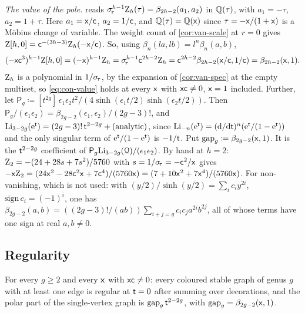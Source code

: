 \emph{The value of the pole.}  reads $\sigma_{\!\tau}^{h-1}\mathrm{Z}_h(\tau)=\beta_{2h-2}(a_1,a_2)$ in $\mathbb{Q}(\tau)$, with $a_1=-\tau$, $a_2=1+\tau$. Here $a_1=\mathsf{x}/\mathsf{c}$, $a_2=1/\mathsf{c}$, and $\mathbb{Q}(\tau)=\mathbb{Q}(\mathsf{x})$ since $\tau=-\mathsf{x}/(1+\mathsf{x})$ is a M\"obius change of variable. The weight count of \cref{cor:van-scale} at $r=0$ gives $\mathrm{Z}[h,0]=\mathsf{c}^{-(3h-3)}\mathrm{Z}_h(-\mathsf{x}/\mathsf{c})$. So, using $\beta_n(la,lb)=l^n\beta_n(a,b)$,
\begin{equation}
\label{eq:con-value}
(-\mathsf{x}\mathsf{c}^3)^{h-1}\mathrm{Z}[h,0]=(-\mathsf{x})^{h-1}\mathrm{Z}_h=\sigma_{\!\tau}^{h-1}\mathsf{c}^{2h-2}\mathrm{Z}_h=\mathsf{c}^{2h-2}\beta_{2h-2}(\mathsf{x}/\mathsf{c},1/\mathsf{c})=\beta_{2h-2}(\mathsf{x},1).
\end{equation}
$\mathrm{Z}_h$ is a polynomial in $1/\sigma_{\!\tau}$, by the expansion of \cref{cor:van-spec} at the empty multiset, so \cref{eq:con-value} holds at every $\mathsf{x}$ with $\mathsf{x}\mathsf{c}\neq 0$, $\mathsf{x}=1$ included. Further, let $\mathsf{P}_g\coloneqq[t^{2g}]\,\epsilon_1\epsilon_2t^2/(4\sinh(\epsilon_1t/2)\sinh(\epsilon_2t/2))$. Then $\mathsf{P}_g/(\epsilon_1\epsilon_2)=\beta_{2g-2}(\epsilon_1,\epsilon_2)/(2g-3)!$, and $\mathrm{Li}_{3-2g}(\mathrm{e}^{\mathsf{t}})=(2g-3)!\,\mathsf{t}^{2-2g}+(\text{analytic})$, since $\mathrm{Li}_{-n}(\mathrm{e}^{\mathsf{t}})=(\mathrm{d}/\mathrm{d}\mathsf{t})^n(\mathrm{e}^{\mathsf{t}}/(1-\mathrm{e}^{\mathsf{t}}))$ and the only singular term of $\mathrm{e}^{\mathsf{t}}/(1-\mathrm{e}^{\mathsf{t}})$ is $-1/\mathsf{t}$. Put $\mathrm{gap}_g\coloneqq\beta_{2g-2}(\mathsf{x},1)$. It is the $\mathsf{t}^{2-2g}$ coefficient of $\mathsf{P}_g\mathrm{Li}_{3-2g}(\mathcal{Q})/(\epsilon_1\epsilon_2)$. By hand at $h=2$: $\mathrm{Z}_2=-(24+28s+7s^2)/5760$ with $s=1/\sigma_{\!\tau}=-\mathsf{c}^2/\mathsf{x}$ gives $-\mathsf{x}\mathrm{Z}_2=(24\mathsf{x}^2-28\mathsf{c}^2\mathsf{x}+7\mathsf{c}^4)/(5760\mathsf{x})=(7+10\mathsf{x}^2+7\mathsf{x}^4)/(5760\mathsf{x})$. For non-vanishing, which is not used: with $(y/2)/\sinh(y/2)=\sum_ic_iy^{2i}$, $\mathrm{sign}\,c_i=(-1)^i$, one has $\beta_{2g-2}(a,b)=((2g-3)!/(ab))\sum_{i+j=g}c_ic_ja^{2i}b^{2j}$, all of whose terms have one sign at real $a,b\neq 0$.

\subsection{Regularity}

\begin{cor}
\label{cor:con-reg}
For every $g\geq 2$ and every $\mathsf{x}$ with $\mathsf{x}\mathsf{c}\neq 0$: every coloured stable graph of genus $g$ with at least one edge is regular at $\mathsf{t}=0$ after summing over decorations, and the polar part of the single-vertex graph is $\mathrm{gap}_g\,\mathsf{t}^{2-2g}$, with $\mathrm{gap}_g=\beta_{2g-2}(\mathsf{x},1)$.
\end{cor}

